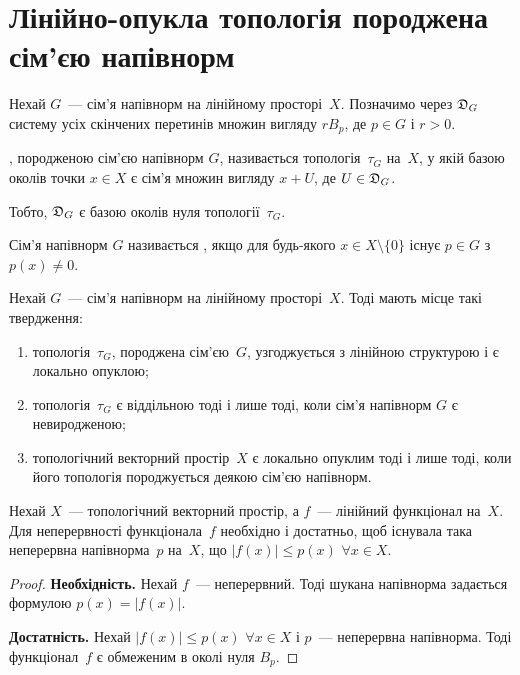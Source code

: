 \section{Лінійно-опукла топологія породжена сім'єю напівнорм}

\begin{definition}
    Нехай $G$~--- сім'я напівнорм на лінійному просторі~$X$. Позначимо через $\frak D_G$ систему усіх скінчених перетинів множин вигляду $r B_p$, де $p \in G$ і $r > 0$.
    
    , породженою сім'єю напівнорм $G$, називається топологія~$\tau_G$ на~$X$, у якій базою околів точки $x \in X$ є сім'я множин вигляду $x + U$, де $U \in \frak D_G$.
\end{definition}

\begin{remark}
    Тобто, $\frak D_G$ є базою околів нуля топології~$\tau_G$.
\end{remark}

\begin{definition}
    Сім'я напівнорм $G$ називається , якщо для будь-якого $x \in X \setminus \{0\}$ існує $p \in G$ з $p(x) \ne 0$.
\end{definition}

\begin{theorem}
    Нехай $G$~--- сім'я напівнорм на лінійному просторі~$X$. Тоді мають місце такі твердження:
    \begin{enumerate}
        \item топологія~$\tau_G$, породжена сім'єю~$G$, узгоджується з лінійною структурою і є локально опуклою;
        \item топологія~$\tau_G$ є віддільною тоді і лише тоді, коли сім'я напівнорм $G$ є невиродженою;
        \item топологічний векторний простір~$X$ є локально опуклим тоді і лише тоді, коли його топологія породжується деякою сім'єю напівнорм.
    \end{enumerate}
\end{theorem}

\begin{theorem}
    Нехай $X$~--- топологічний векторний простір, а $f$~--- лінійний функціонал на~$X$. Для неперервності функціонала~$f$ необхідно і достатньо, щоб існувала така неперервна напівнорма~$p$ на~$X$, що $|f(x)| \le p(x)$ $\forall x \in X$.
\end{theorem}

\begin{proof}
    \textbf{Необхідність.} Нехай $f$~--- неперервний. Тоді шукана напівнорма задається формулою $p(x) = |f(x)|$.

    \textbf{Достатність.} Нехай $|f(x)| \le p(x)$ $\forall x \in X$ і $p$~--- неперервна напівнорма. Тоді функціонал~$f$ є обмеженим в околі нуля $B_p$. 
\end{proof}

